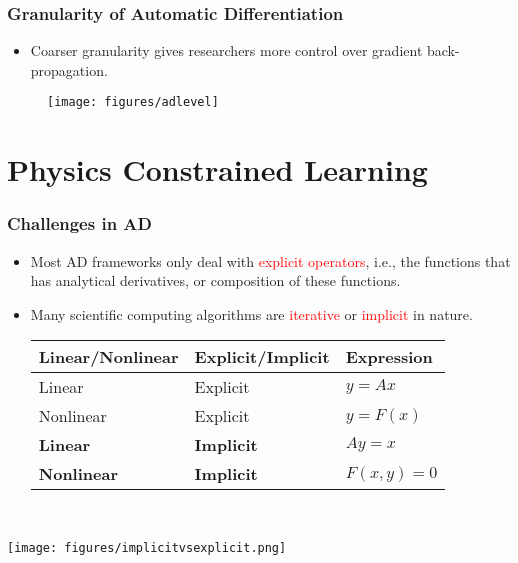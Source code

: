 \documentclass[usenames,dvipsnames]{beamer}
\begin{document}
\begin{frame}
	\frametitle{Granularity of Automatic Differentiation}
	
	\begin{itemize}
		\item Coarser granularity gives researchers more control over gradient back-propagation. 
	\end{itemize}
	
	
	\begin{figure}[hbt]
		\centering
		\texttt{[image: figures/adlevel]}
	\end{figure}
	
	
	
\end{frame}

\section{Physics Constrained Learning}

\begin{frame}
	
	
	\frametitle{Challenges in AD}
	
	
	\begin{minipage}{0.695\textwidth}
		\vspace{-6cm}
		\begin{itemize}
			\item Most AD frameworks only deal with \textcolor{red}{explicit operators}, i.e., the functions that has analytical derivatives, or composition of these functions. 
			\item Many scientific computing algorithms are \textcolor{red}{iterative} or \textcolor{red}{implicit} in nature.
			\vspace{1cm}
			{\small
			\begin{table}[]
				\begin{tabular}{@{}lll@{}}
					\toprule
					Linear/Nonlinear & Explicit/Implicit & Expression   \\ \midrule
					Linear           & Explicit          & $y=Ax$       \\
					Nonlinear        & Explicit          & $y = F(x)$   \\
					\textbf{Linear}           & \textbf{Implicit}          & $Ay = x$     \\
					\textbf{Nonlinear}        & \textbf{Implicit}          & $F(x,y) = 0$ \\ \bottomrule
				\end{tabular}
			\end{table}
		}
		\end{itemize}
	\end{minipage}~
	\begin{minipage}[t]{0.3\textwidth}
		\texttt{[image: figures/implicitvsexplicit.png]}
	\end{minipage}
	
	
\end{frame}
\end{document}
